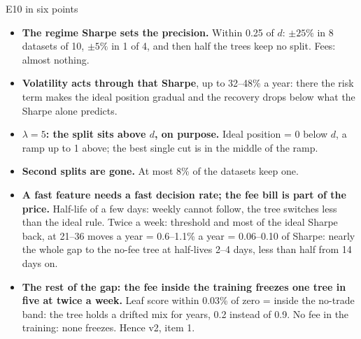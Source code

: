 \documentclass[10pt,aspectratio=169]{beamer}
\newcommand{\1}{\mathbf{1}}
\begin{document}
\begin{frame}{E10 in six points}
\small
\begin{itemize}
\item \textbf{The regime Sharpe sets the precision.} Within 0.25 of $d$: $\pm25\%$ in 8 datasets of 10, $\pm5\%$ in 1 of 4, and then half the trees keep no split. Fees: almost nothing.
\item \textbf{Volatility acts through that Sharpe}, up to 32--48\% a year: there the risk term makes the ideal position gradual and the recovery drops below what the Sharpe alone predicts.
\item \textbf{$\lambda=5$: the split sits above $d$, on purpose.} Ideal position = 0 below $d$, a ramp up to 1 above; the best single cut is in the middle of the ramp.
\item \textbf{Second splits are gone.} At most 8\% of the datasets keep one.
\item \textbf{A fast feature needs a fast decision rate; the fee bill is part of the price.} Half-life of a few days: weekly cannot follow, the tree switches less than the ideal rule. Twice a week: threshold and most of the ideal Sharpe back, at 21--36 moves a year = 0.6--1.1\% a year = 0.06--0.10 of Sharpe: nearly the whole gap to the no-fee tree at half-lives 2--4 days, less than half from 14 days on.
\item \textbf{The rest of the gap: the fee inside the training freezes one tree in five at twice a week.} Leaf score within 0.03\% of zero = inside the no-trade band: the tree holds a drifted mix for years, 0.2 instead of 0.9. No fee in the training: none freezes. Hence v2, item 1.
\end{itemize}
\end{frame}
\end{document}
